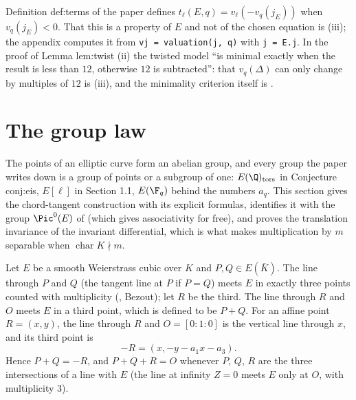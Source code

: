 \begin{paperlink}\label{pl:ellcurves:terms}
Definition def:terms of the paper defines $t_\ell(E,q)=v_\ell(-v_q(j_E))$ when $v_q(j_E)<0$. That this is a property of $E$ and not of the
chosen equation is (iii); the appendix computes it from \texttt{vj = valuation(j, q)} with \texttt{j = E.j}. In the proof of Lemma
lem:twist (ii) the twisted model ``is minimal exactly when the result is less than $12$, otherwise $12$ is subtracted'': that $v_q(\Delta)$ can
only change by multiples of $12$ is (iii), and the minimality criterion itself is .
\end{paperlink}

\section{The group law}\label{sec:ellcurves:grouplaw}

The points of an elliptic curve form an abelian group, and every group the paper writes down is a group of points or a subgroup of one:
$E(\Q)_{\mathrm{tors}}$ in Conjecture conj:eis, $E[\ell]$ in Section 1.1, $E(\F_q)$ behind the numbers $a_q$. This section gives the
chord-tangent construction with its explicit formulas, identifies it with the group $\Pic^0(E)$ of  (which gives
associativity for free), and proves the translation invariance of the invariant differential, which is what makes multiplication by $m$
separable when $\operatorname{char}K\nmid m$.

\begin{construction}\label{con:ellcurves:chordtangent}
Let $E$ be a smooth Weierstrass cubic over $K$ and $P,Q\in E(\bar K)$. The line through $P$ and $Q$ (the tangent line at $P$ if $P=Q$) meets
$E$ in exactly three points counted with multiplicity (, Bezout); let $R$ be the third. The line through $R$ and $O$ meets $E$ in a
third point, which is defined to be $P+Q$. For an affine point $R=(x,y)$, the line through $R$ and $O=[0:1:0]$ is the vertical line through $x$,
and its third point is
\[
-R=(x,-y-a_1x-a_3).
\]
Hence $P+Q=-R$, and $P+Q+R=O$ whenever $P$, $Q$, $R$ are the three intersections of a line with $E$ (the line at infinity $Z=0$ meets $E$ only at
$O$, with multiplicity $3$).
\end{construction}

